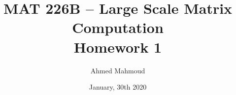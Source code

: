 \documentclass[12pt] {article}
\begin{document}
\title{MAT 226B – Large Scale Matrix Computation \\ Homework 1}
\author{Ahmed Mahmoud}
\date{January, 30th 2020} 

\maketitle











\end{document}
